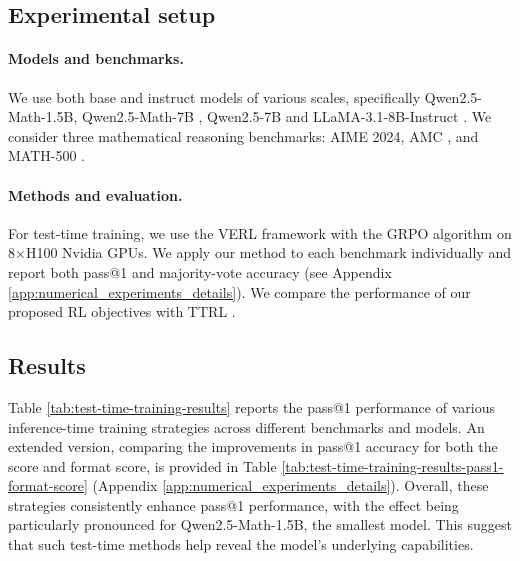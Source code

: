 \subsection{Experimental setup}\label{subsec:experimental_setup}

\paragraph{Models and benchmarks.}
We use both base and instruct models of various scales, specifically Qwen2.5-Math-1.5B, Qwen2.5-Math-7B \citep{yang2024qwen25mathtechnicalreportmathematical}, Qwen2.5-7B \citep{qwen2025qwen25technicalreport} and LLaMA-3.1-8B-Instruct \citep{grattafiori2024llama3herdmodels}.
We consider three mathematical reasoning benchmarks: AIME 2024, AMC \citep{li2024numinamath}, and MATH-500 \citep{hendrycks2021measuring}.

\paragraph{Methods and evaluation.}
For test-time training, we use the VERL framework \citep{sheng2024hybridflow} with the GRPO algorithm \citep{shao2024deepseekmathpushinglimitsmathematical} on 8$\times$H100 Nvidia GPUs. We apply our method to each benchmark individually and report both pass@1 and majority-vote accuracy (see Appendix \ref{app:numerical_experiments_details}). We compare the performance of our proposed RL objectives with TTRL \citep{zuo2025ttrl}. 


\subsection{Results}\label{subsec:experimental_results}
Table \ref{tab:test-time-training-results} reports the pass@1 performance of various inference-time training strategies across different benchmarks and models. An extended version, comparing the improvements in pass@1 accuracy for both the score and format score, is provided in Table \ref{tab:test-time-training-results-pass1-format-score} (Appendix \ref{app:numerical_experiments_details}).
Overall, these strategies consistently enhance pass@1 performance, with the effect being particularly pronounced for Qwen2.5-Math-1.5B, the smallest model.
This suggest that such test-time methods help reveal the model’s underlying capabilities.


